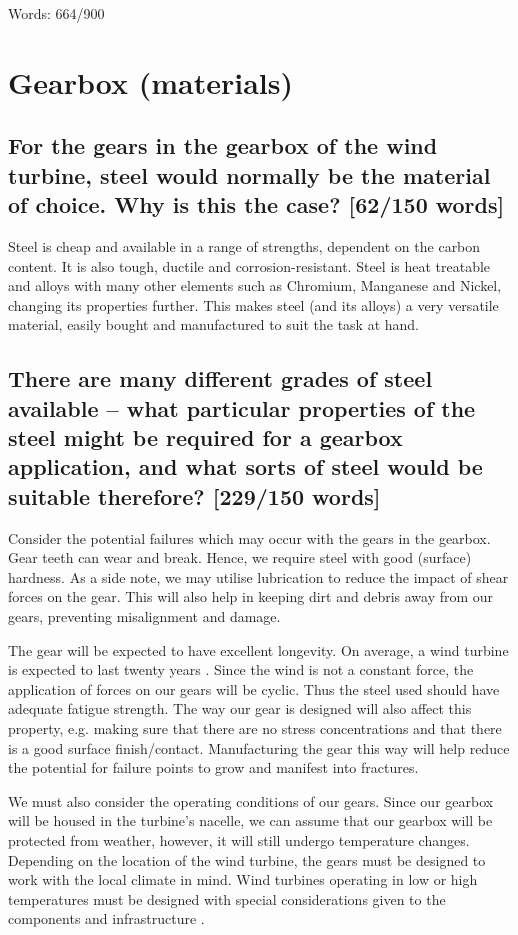 \documentclass[12pt]{article}
\numberwithin{equation}{section}
\begin{document}
\begin{flushleft}
Words: 664/900
\section{Gearbox (materials)}
\subsection[Why is steel used?]{For the gears in the gearbox of the wind turbine, steel would normally be the material of choice. Why is this the case? [62/150 words]}
Steel is cheap and available in a range of strengths, dependent on the carbon content. It is also tough, ductile and corrosion-resistant. Steel is heat treatable and alloys with many other elements such as Chromium, Manganese and Nickel, changing its properties further. This makes steel (and its alloys) a very versatile material, easily bought and manufactured to suit the task at hand. 
\subsection[Which steel is more suitable?]{There are many different grades of steel available – what particular properties of the steel might be required for a gearbox application, and what sorts of steel would be suitable therefore? [229/150 words]}
Consider the potential failures which may occur with the gears in the gearbox. Gear teeth can wear and break. Hence, we require steel with good (surface) hardness. As a side note, we may utilise lubrication to reduce the impact of shear forces on the gear. This will also help in keeping dirt and debris away from our gears, preventing misalignment and damage. 

The gear will be expected to have excellent longevity. On average, a wind turbine is expected to last twenty years \citep{windTurbineLifetime}. Since the wind is not a constant force, the application of forces on our gears will be cyclic. Thus the steel used should have adequate fatigue strength. The way our gear is designed will also affect this property, e.g. making sure that there are no stress concentrations and that there is a good surface finish/contact. Manufacturing the gear this way will help reduce the potential for failure points to grow and manifest into fractures. 

We must also consider the operating conditions of our gears. Since our gearbox will be housed in the turbine's nacelle, we can assume that our gearbox will be protected from weather, however, it will still undergo temperature changes. Depending on the location of the wind turbine, the gears must be designed to work with the local climate in mind. Wind turbines operating in low or high temperatures must be designed with special considerations given to the components and infrastructure \citep{windTurbineOperatingConditions}. 


\end{flushleft}
\end{document}
